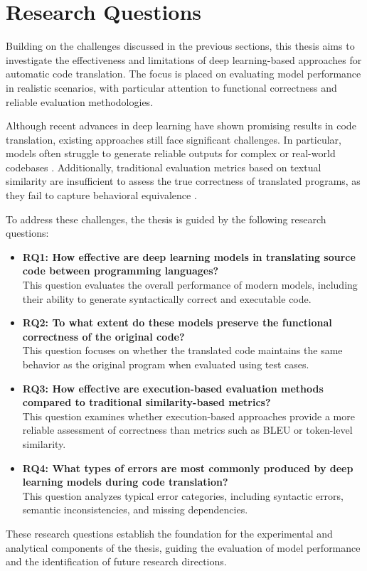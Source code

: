 \section{Research Questions}


Building on the challenges discussed in the previous sections, this thesis aims
to investigate the effectiveness and limitations of deep learning-based
approaches for automatic code translation. The focus is placed on evaluating
model performance in realistic scenarios, with particular attention to
functional correctness and reliable evaluation methodologies.

Although recent advances in deep learning have shown promising results in code
translation, existing approaches still face significant challenges. In
particular, models often struggle to generate reliable outputs for complex or
real-world codebases \cite{llm_limitations}. Additionally, traditional
evaluation metrics based on textual similarity are insufficient to assess the
true correctness of translated programs, as they fail to capture behavioral
equivalence \cite{evaluation_limitations}.

To address these challenges, the thesis is guided by the following research
questions:

\begin{itemize}
    \item \textbf{RQ1: How effective are deep learning models in translating
    source code between programming languages?} \\
    This question evaluates the overall performance of modern models, including
    their ability to generate syntactically correct and executable code.

    \item \textbf{RQ2: To what extent do these models preserve the functional
    correctness of the original code?} \\
    This question focuses on whether the translated code maintains the same
    behavior as the original program when evaluated using test cases.

    \item \textbf{RQ3: How effective are execution-based evaluation methods
    compared to traditional similarity-based metrics?} \\
    This question examines whether execution-based approaches provide a more
    reliable assessment of correctness than metrics such as BLEU or token-level
    similarity.

    \item \textbf{RQ4: What types of errors are most commonly produced by deep
    learning models during code translation?} \\
    This question analyzes typical error categories, including syntactic errors,
    semantic inconsistencies, and missing dependencies.
\end{itemize}

These research questions establish the foundation for the experimental and analytical components of the thesis, guiding the evaluation of model performance and the identification of future research directions.